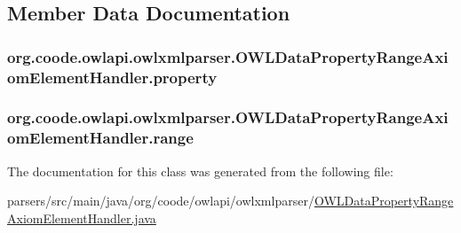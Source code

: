 \subsection{Member Data Documentation}
\hypertarget{classorg_1_1coode_1_1owlapi_1_1owlxmlparser_1_1_o_w_l_data_property_range_axiom_element_handler_a2fb2a0635770f381a3e8e465d64d89f0}{
\subsubsection[{property}]{ org.\-coode.\-owlapi.\-owlxmlparser.\-O\-W\-L\-Data\-Property\-Range\-Axiom\-Element\-Handler.\-property\hspace{0.3cm}{\ttfamily [private]}}}\label{classorg_1_1coode_1_1owlapi_1_1owlxmlparser_1_1_o_w_l_data_property_range_axiom_element_handler_a2fb2a0635770f381a3e8e465d64d89f0}
\hypertarget{classorg_1_1coode_1_1owlapi_1_1owlxmlparser_1_1_o_w_l_data_property_range_axiom_element_handler_a09c6699d794a7fbc17c676acf0a77079}{
\subsubsection[{range}]{ org.\-coode.\-owlapi.\-owlxmlparser.\-O\-W\-L\-Data\-Property\-Range\-Axiom\-Element\-Handler.\-range\hspace{0.3cm}{\ttfamily [private]}}}\label{classorg_1_1coode_1_1owlapi_1_1owlxmlparser_1_1_o_w_l_data_property_range_axiom_element_handler_a09c6699d794a7fbc17c676acf0a77079}


The documentation for this class was generated from the following file\-:\begin{DoxyCompactItemize}
\item 
parsers/src/main/java/org/coode/owlapi/owlxmlparser/\hyperlink{_o_w_l_data_property_range_axiom_element_handler_8java}{O\-W\-L\-Data\-Property\-Range\-Axiom\-Element\-Handler.\-java}\end{DoxyCompactItemize}
